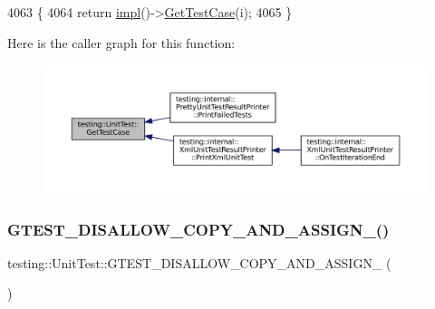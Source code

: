 \begin{DoxyCode}
4063                                                  \{
4064   \textcolor{keywordflow}{return} \hyperlink{classtesting_1_1UnitTest_a4df5d11a58affb337d7fa62eaa07690e}{impl}()->\hyperlink{classtesting_1_1internal_1_1UnitTestImpl_a6438e18ea4904d239a3db7b036a52229}{GetTestCase}(i);
4065 \}
\end{DoxyCode}
Here is the caller graph for this function\+:
\nopagebreak
\begin{figure}[H]
\begin{center}
\leavevmode
\includegraphics[width=350pt]{classtesting_1_1UnitTest_a724d4c8be4481e0c1523a22b72dc7dac_icgraph}
\end{center}
\end{figure}
\mbox{\label{classtesting_1_1UnitTest_a1e04cfb4f837cea288a98f2a64c43bba}} 
\subsubsection{\texorpdfstring{G\+T\+E\+S\+T\+\_\+\+D\+I\+S\+A\+L\+L\+O\+W\+\_\+\+C\+O\+P\+Y\+\_\+\+A\+N\+D\+\_\+\+A\+S\+S\+I\+G\+N\+\_\+()}{GTEST\_DISALLOW\_COPY\_AND\_ASSIGN\_()}}
{\footnotesize\ttfamily testing\+::\+Unit\+Test\+::\+G\+T\+E\+S\+T\+\_\+\+D\+I\+S\+A\+L\+L\+O\+W\+\_\+\+C\+O\+P\+Y\+\_\+\+A\+N\+D\+\_\+\+A\+S\+S\+I\+G\+N\+\_\+ (\begin{DoxyParamCaption}\item[{\hyperlink{classtesting_1_1UnitTest}{Unit\+Test}}]{ }\end{DoxyParamCaption})\hspace{0.3cm}{\ttfamily [private]}}

